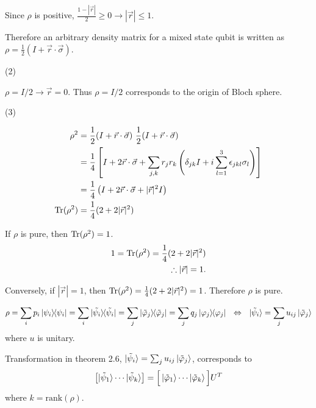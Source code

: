 Since $\rho$ is positive, $\frac{1 - |\vec{r}|}{2} \geq 0 \rightarrow |\vec{r}| \leq 1$.

Therefore an arbitrary density matrix for a mixed state qubit is written as $\rho = \frac{1}{2} (I + \vec{r} \cdot \vec{\sigma})$.

\vspace{5mm}
(2)

$\rho = I / 2 \rightarrow \vec{r}  = 0$. Thus  $\rho = I / 2$ corresponds to the origin of Bloch sphere.

\vspace{5mm}
(3)

\begin{align*}
    \rho^2 &= \frac{1}{2} (I + \vec{r} \cdot \vec{\sigma})~ \frac{1}{2} (I + \vec{r} \cdot \vec{\sigma})\\
        &= \frac{1}{4} \left[ I + 2 \vec{r}\cdot \vec{\sigma} + \sum_{j,k}r_j r_k \left(\delta_{jk} I + i \sum_{l=1}^3 \epsilon_{jkl}\sigma_l \right)  \right]\\
        &= \frac{1}{4} \left(I + 2 \vec{r}\cdot \vec{\sigma} + |\vec{r}|^2 I \right)\\
    \operatorname{Tr} (\rho^2) &= \frac{1}{4} (2 + 2|\vec{r}|^2)
\end{align*}

If $\rho$ is pure, then $\operatorname{Tr} (\rho^2) = 1$.
\begin{align*}
   1 =  \operatorname{Tr} (\rho^2) = \frac{1}{4} (2 + 2|\vec{r}|^2)\\
   \therefore |\vec{r}| = 1.
\end{align*}

Conversely, if $|\vec{r}| = 1$, then $\operatorname{Tr} (\rho^2) = \frac{1}{4} (2 + 2|\vec{r}|^2) = 1$. Therefore $\rho$ is pure.




\begin{screen}
%
    \begin{align*}
        \rho = \sum_i p_i \ket{\psi_i}\hspace{-1mm} \bra{\psi_i} = \sum_i \ket{\tilde{\psi_i}}\hspace{-1mm} \bra{\tilde{\psi_i}} = \sum_j \ket{\tilde{\varphi}_j}\hspace{-1mm} \bra{\tilde{\varphi}_j} = \sum_j q_j \ket{\varphi_j}\hspace{-1mm} \bra{\varphi_j} ~~ \Leftrightarrow ~~ \ket{\tilde{\psi}_i} = \sum_j u_{ij} \ket{\tilde{\varphi}_j}
    \end{align*}
    where $u$ is unitary.

	Transformation in theorem 2.6, $\ket{\tilde{\psi}_i} = \sum_j u_{ij} \ket{\tilde{\varphi}_j}$, corresponds to
	\begin{align*}
	    \left[ \ket{\tilde{\psi}_1} \cdots \ket{\tilde{\psi}_k} \right] = \Big[ \ket{\tilde{\varphi}_1} \cdots \ket{\tilde{\varphi}_k} \Big] U^T
	\end{align*}
	where $k = \mathrm{rank} (\mathcal{\rho})$.
\end{screen}

